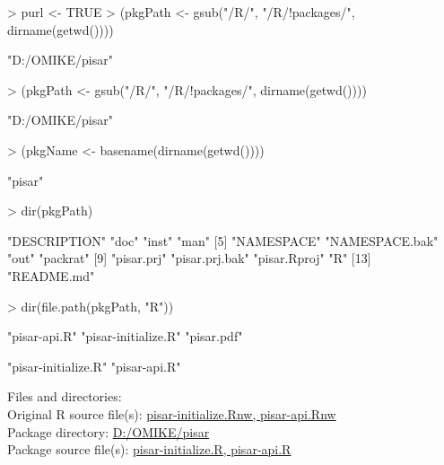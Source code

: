\documentclass[a4paper,12pt]{article}\usepackage[]{graphicx}\usepackage[]{color}
\begin{document}
\begin{Schunk}
\begin{Sinput}
> purl <- TRUE
> (pkgPath <- gsub("/R/", "/R/!packages/", dirname(getwd())))
\end{Sinput}
\begin{Soutput}
[1] "D:/OMIKE/pisar"
\end{Soutput}
\begin{Sinput}
> (pkgPath <- gsub("/R/", "/R/!packages/", dirname(getwd())))
\end{Sinput}
\begin{Soutput}
[1] "D:/OMIKE/pisar"
\end{Soutput}
\begin{Sinput}
> (pkgName <- basename(dirname(getwd())))
\end{Sinput}
\begin{Soutput}
[1] "pisar"
\end{Soutput}
\begin{Sinput}
> dir(pkgPath)
\end{Sinput}
\begin{Soutput}
 [1] "DESCRIPTION"   "doc"           "inst"          "man"          
 [5] "NAMESPACE"     "NAMESPACE.bak" "out"           "packrat"      
 [9] "pisar.prj"     "pisar.prj.bak" "pisar.Rproj"   "R"            
[13] "README.md"    
\end{Soutput}
\begin{Sinput}
> dir(file.path(pkgPath, "R"))
\end{Sinput}
\begin{Soutput}
[1] "pisar-api.R"        "pisar-initialize.R" "pisar.pdf"         
\end{Soutput}
\begin{Soutput}
[1] "pisar-initialize.R" "pisar-api.R"       
\end{Soutput}
\end{Schunk}

Files and directories:\\[12pt]
Original R source file(s): \url{pisar-initialize.Rnw, pisar-api.Rnw}\\
Package directory: \url{D:/OMIKE/pisar}\\
Package source file(s): \url{pisar-initialize.R, pisar-api.R}
\end{document}
